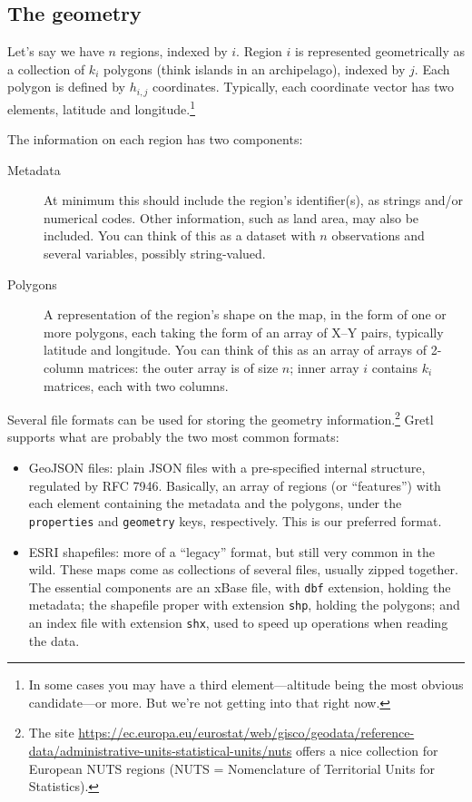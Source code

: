 \documentclass{article}
\begin{document}
\subsection{The geometry}
\label{sec:geometry}

Let's say we have $n$ regions, indexed by $i$. Region $i$ is
represented geometrically as a collection of $k_i$ polygons (think
islands in an archipelago), indexed by $j$. Each polygon is defined by
$h_{i,j}$ coordinates. Typically, each coordinate vector has two
elements, latitude and longitude.\footnote{In some cases you may have
  a third element---altitude being the most obvious candidate---or
  more.  But we're not getting into that right now.}

The information on each region has two components:
\begin{description}
\item[Metadata] At minimum this should include the region's
  identifier(s), as strings and/or numerical codes. Other information,
  such as land area, may also be included. You can think of this as a
  dataset with $n$ observations and several variables, possibly
  string-valued.
\item[Polygons] A representation of the region's shape on the map, in
  the form of one or more polygons, each taking the form of an array
  of X--Y pairs, typically latitude and longitude. You can think of
  this as an array of arrays of 2-column matrices: the outer array is
  of size $n$; inner array $i$ contains $k_i$ matrices, each with two
  columns.
\end{description}

Several file formats can be used for storing the geometry
information.\footnote{The site
\url{https://ec.europa.eu/eurostat/web/gisco/geodata/reference-data/administrative-units-statistical-units/nuts}
offers a nice collection for European NUTS regions (NUTS =
Nomenclature of Territorial Units for Statistics).}
Gretl supports what are probably the two most common formats:
\begin{itemize}
\item GeoJSON files: plain JSON files with a pre-specified internal
  structure, regulated by RFC 7946. Basically, an array of regions (or
  ``features'') with each element containing the metadata and the
  polygons, under the \texttt{properties} and \texttt{geometry} keys,
  respectively.  This is our preferred format.
\item ESRI shapefiles: more of a ``legacy'' format, but still very
  common in the wild. These maps come as collections of several files,
  usually zipped together. The essential components are an
  \textsf{xBase} file, with \texttt{dbf} extension, holding the
  metadata; the shapefile proper with extension \texttt{shp}, holding
  the polygons; and an index file with extension \texttt{shx}, used
  to speed up operations when reading the data.
\end{itemize}
\end{document}
